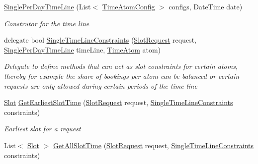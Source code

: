 \begin{DoxyCompactItemize}
\item 
\hyperlink{class_general_health_care_elements_1_1_booking_models_1_1_single_per_day_time_line_a12291fc22683ba06337ec5c0b26f102d}{Single\+Per\+Day\+Time\+Line} (List$<$ \hyperlink{class_general_health_care_elements_1_1_booking_models_1_1_time_atom_config}{Time\+Atom\+Config} $>$ configs, Date\+Time date)
\begin{DoxyCompactList}\small\item\em Construtor for the time line \end{DoxyCompactList}\item 
delegate bool \hyperlink{class_general_health_care_elements_1_1_booking_models_1_1_single_per_day_time_line_a3395e1041e84c6a9ce3a2f32fa2398d1}{Single\+Time\+Line\+Constraints} (\hyperlink{class_general_health_care_elements_1_1_booking_models_1_1_slot_request}{Slot\+Request} request, \hyperlink{class_general_health_care_elements_1_1_booking_models_1_1_single_per_day_time_line}{Single\+Per\+Day\+Time\+Line} time\+Line, \hyperlink{class_general_health_care_elements_1_1_booking_models_1_1_time_atom}{Time\+Atom} atom)
\begin{DoxyCompactList}\small\item\em Delegate to define methods that can act as slot constraints for certain atoms, thereby for example the share of bookings per atom can be balanced or certain requests are only allowed during certain periods of the time line \end{DoxyCompactList}\item 
\hyperlink{class_general_health_care_elements_1_1_booking_models_1_1_slot}{Slot} \hyperlink{class_general_health_care_elements_1_1_booking_models_1_1_single_per_day_time_line_aad025ce2c2d181556bbbbd92e2598a73}{Get\+Earliest\+Slot\+Time} (\hyperlink{class_general_health_care_elements_1_1_booking_models_1_1_slot_request}{Slot\+Request} request, \hyperlink{class_general_health_care_elements_1_1_booking_models_1_1_single_per_day_time_line_a3395e1041e84c6a9ce3a2f32fa2398d1}{Single\+Time\+Line\+Constraints} constraints)
\begin{DoxyCompactList}\small\item\em Earliest slot for a request \end{DoxyCompactList}\item 
List$<$ \hyperlink{class_general_health_care_elements_1_1_booking_models_1_1_slot}{Slot} $>$ \hyperlink{class_general_health_care_elements_1_1_booking_models_1_1_single_per_day_time_line_a999f8770684b7f974c91056a4b70b2e0}{Get\+All\+Slot\+Time} (\hyperlink{class_general_health_care_elements_1_1_booking_models_1_1_slot_request}{Slot\+Request} request, \hyperlink{class_general_health_care_elements_1_1_booking_models_1_1_single_per_day_time_line_a3395e1041e84c6a9ce3a2f32fa2398d1}{Single\+Time\+Line\+Constraints} constraints)

\end{DoxyCompactItemize}
